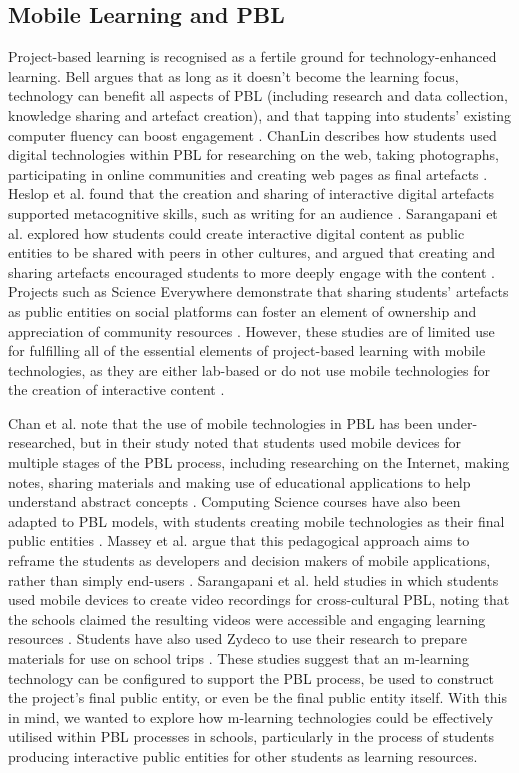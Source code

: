 \subsection{Mobile Learning and PBL}
Project-based learning is recognised as a fertile ground for technology-enhanced learning. Bell argues that as long as it doesn't become the learning focus, technology can benefit all aspects of PBL (including research and data collection, knowledge sharing and artefact creation), and that tapping into students' existing computer fluency can boost engagement \citep{Bell2010}. ChanLin describes how students used digital technologies within PBL for researching on the web, taking photographs, participating in online communities and creating web pages as final artefacts \citep{ChanLin2008}. Heslop et al. found that the creation and sharing of interactive digital artefacts supported metacognitive skills, such as writing for an audience \citep{Heslop2017}. Sarangapani et al. explored how students could create interactive digital content as public entities to be shared with peers in other cultures, and argued that creating and sharing artefacts encouraged students to more deeply engage with the content \citep{Sarangapani2018}. Projects such as Science Everywhere demonstrate that sharing students' artefacts as public entities on social platforms can foster an element of ownership and appreciation of community resources \citep{ahn2018}. However, these studies are of limited use for fulfilling all of the essential elements of project-based learning with mobile technologies, as they are either lab-based \citep{Heslop2017} or do not use mobile technologies for the creation of interactive content \citep{Sarangapani2018, ChanLin2008}.

Chan et al. note that the use of mobile technologies in PBL has been under-researched, but in their study noted that students used mobile devices for multiple stages of the PBL process, including researching on the Internet, making notes, sharing materials and making use of educational applications to help understand abstract concepts \citep{Chan2015}. Computing Science courses have also been adapted to PBL models, with students creating mobile technologies as their final public entities \citep{Massey2006, Rahman2018}. Massey et al. argue that this pedagogical approach aims to reframe the students as developers and decision makers of mobile applications, rather than simply end-users \citep{Massey2006}. Sarangapani et al. held studies in which students used mobile devices to create video recordings for cross-cultural PBL, noting that the schools claimed the resulting videos were accessible and engaging learning resources \citep{Sarangapani2016}. Students have also used Zydeco to use their research to prepare materials for use on school trips \citep{kuhn2011}. These studies suggest that an m-learning technology can be configured to support the PBL process, be used to construct the project's final public entity, or even be the final public entity itself. With this in mind, we wanted to explore how m-learning technologies could be effectively utilised within PBL processes in schools, particularly in the process of students producing interactive public entities for other students as learning resources.

